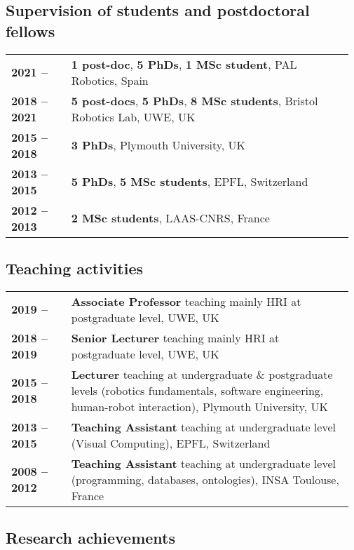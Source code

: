 \subsection{Supervision of students and postdoctoral fellows}

\begin{tabular}{p{0.17\linewidth}p{0.8\linewidth}}
    \bf 2021 --  & \textbf{1 post-doc}, \textbf{5 PhDs}, \textbf{1 MSc student}, PAL Robotics, Spain \\
    \bf 2018 -- 2021 & \textbf{5 post-docs}, \textbf{5 PhDs}, \textbf{8 MSc students}, Bristol Robotics Lab, UWE, UK \\
    \bf 2015 -- 2018 & \textbf{3 PhDs}, Plymouth University, UK \\
    \bf 2013 -- 2015 & \textbf{5 PhDs}, \textbf{5 MSc students}, EPFL, Switzerland \\
    \bf 2012 -- 2013 & \textbf{2 MSc students}, LAAS-CNRS, France \\
\end{tabular}


\subsection{Teaching activities}

\begin{tabular}{p{0.17\linewidth}p{0.8\linewidth}}
    \bf 2019 --  & \textbf{Associate Professor} teaching mainly HRI at postgraduate level, UWE, UK \\
    \bf 2018 -- 2019 & \textbf{Senior Lecturer} teaching mainly HRI at postgraduate level, UWE, UK \\
    \bf 2015 -- 2018 & \textbf{Lecturer} teaching at undergraduate \&
    postgraduate levels (robotics fundamentals, software engineering, human-robot interaction), Plymouth University, UK \\
    \bf 2013 -- 2015 & \textbf{Teaching Assistant} teaching at undergraduate level (Visual Computing), EPFL, Switzerland \\
    \bf 2008 -- 2012 & \textbf{Teaching Assistant} teaching at undergraduate level (programming, databases, ontologies), INSA Toulouse, France \\
\end{tabular}


\subsection{Research achievements}

